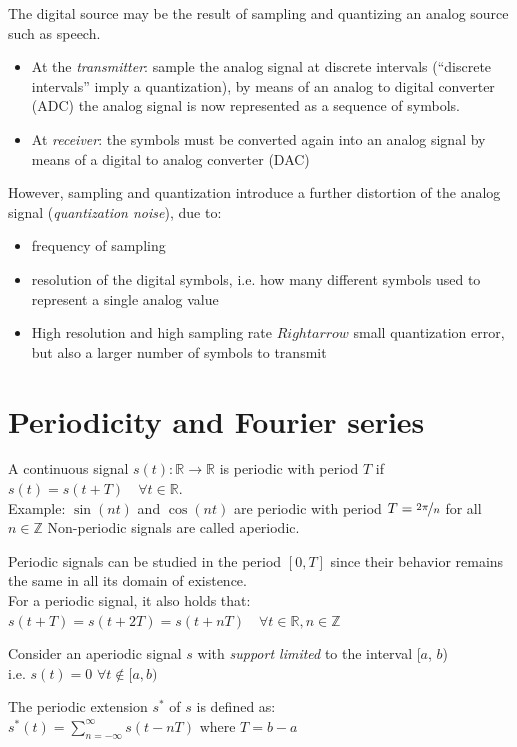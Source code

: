 The digital source may be the result of sampling and quantizing an analog source
such as speech.
\begin{itemize}
   \item 
   At the \textit{transmitter}:
   sample the analog signal at discrete intervals (``discrete intervals'' imply a quantization), by
   means of an analog to digital converter (ADC)
   the analog signal is now represented as a sequence of symbols.
   \item
   At \textit{receiver}:
   the symbols must be converted again into an analog signal
   by means of a digital to analog converter (DAC)
\end{itemize}


However, sampling and quantization introduce a further distortion of the analog signal (\textit{quantization noise}), due to:
\begin{itemize}
   \item frequency of sampling
   \item resolution of the digital symbols, i.e. how many different symbols used to represent a single analog value
   \item[]
   High resolution and high sampling rate $Rightarrow$ small quantization error, but also a larger number of symbols to transmit
\end{itemize}

\section{Periodicity and Fourier series}

\begin{definition}
   
   A continuous signal $s(t): \mathbb{R} \rightarrow \mathbb{R}$ is periodic with period $T$ if
   $s(t) = s(t + T) \quad \forall t \in \mathbb{R}$.\\
   Example: $\sin(nt)$ and $\cos(nt)$ are periodic with period $T = \nicefrac{2\pi}{n}$ for all $n \in \mathbb{Z}$
   Non-periodic signals are called aperiodic.

   Periodic signals can be studied in the period $[0, T]$ since their behavior remains the same in all its domain of existence.\\
   For a periodic signal, it also holds that:
   $s(t + T) = s(t + 2T) = s(t + nT) \quad \forall t \in \mathbb{R}, n \in \mathbb{Z}$
\end{definition}

\begin{definition}
   
   Consider an aperiodic signal $s$ with \textit{support limited} to the interval [$a$, $b$)\\
   i.e. $s(t) = 0$ $\forall t \notin [a, b)$
   
   The periodic extension $s^*$ of $s$ is defined as:
   $s^*(t) = \sum_{n=-\infty}^{\infty} s(t - nT) \text{ where } T = b - a$
   
\end{definition}

